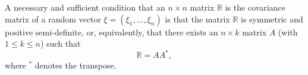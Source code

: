 A necessary and sufficient condition that an $n \times n$ matrix $\mathbb{R}$ is the covariance matrix of a random vector $\xi = (\xi_1, \ldots, \xi_n)$ is that the matrix $\mathbb{R}$ is symmetric and positive semi-definite, or, equivalently, that there exists an $n \times k$ matrix $A$ (with $1 \leq k \leq n$) such that
$$\mathbb{R} = AA^*,$$
where $^*$ denotes the transpose.
